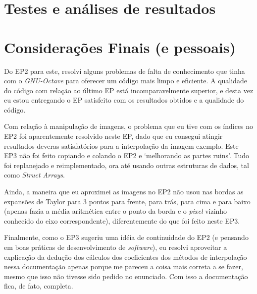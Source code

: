 \documentclass[11pt]{article}
\begin{document}
  \pagebreak

  \section{Testes e análises de resultados}

  \section{Considerações Finais (e pessoais)}

  \indent\indent Do EP2 para este, resolvi alguns problemas de falta de conhecimento que tinha com o \textit{GNU-Octave} para oferecer um código mais limpo e eficiente. A qualidade do código
  com relação ao último EP está incomparavelmente superior, e desta vez eu estou entregando o EP satisfeito com os resultados obtidos e a qualidade do código.

  Com relação à manipulação de imagens, o problema que eu tive com os índices no EP2 foi aparentemente resolvido neste EP, dado que eu consegui atingir resultados deveras satisfatórios para a interpolação da imagem exemplo.
  Este EP3 não foi feito copiando e colando o EP2 e `melhorando as partes ruins'. Tudo foi replanejado e reimplementado, ora até usando outras estruturas de dados, tal como \textit{Struct Arrays}.

  Ainda, a maneira que eu aproximei as imagens no EP2 não usou nas bordas as expansões de Taylor para 3 pontos para frente, para trás, para cima e para baixo (apenas fazia a média aritmética entre o ponto da borda
  e o \textit{pixel} vizinho conhecido do eixo correspondente), diferentemente do que foi feito neste EP3.

  Finalmente, como o EP3 sugeriu uma idéia de continuidade do EP2 (e pensando em boas práticas de desenvolvimento de \textit{software}), eu resolvi aproveitar a explicação da dedução dos cálculos dos
  coeficientes dos métodos de interpolação nessa documentação apenas porque me pareceu a coisa mais correta a se fazer, mesmo que isso não tivesse sido pedido no enunciado. Com isso a documentação fica, de fato, completa.
\end{document}
